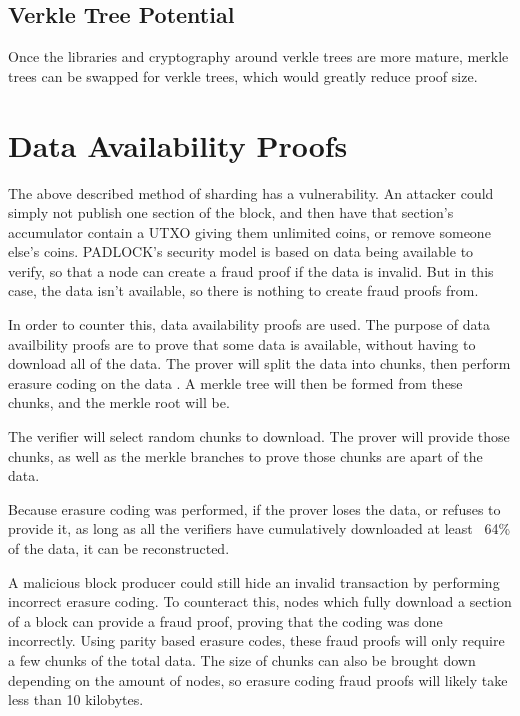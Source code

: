 \documentclass[12pt, letterpaper]{article}
\begin{document}

\subsection{Verkle Tree Potential}
Once the libraries and cryptography around verkle trees are more mature, merkle
trees can be swapped for verkle trees, which would greatly reduce proof size.

\section{Data Availability Proofs}
The above described method of sharding has a vulnerability. An attacker could
simply not publish one section of the block, and then have that section's
accumulator contain a UTXO giving them unlimited coins, or remove someone else's
coins. PADLOCK's security model is based on data being available to verify, so
that a node can create a fraud proof if the data is invalid. But in this case,
the data isn't available, so there is nothing to create fraud proofs from.

In order to counter this, data availability proofs are used. The purpose of data
availbility proofs are to prove that some data is available, without having to
download all of the data. The prover will split the data into chunks, then
perform erasure coding on the data . A merkle tree will then be formed from
these chunks, and the merkle root will be.

The verifier will select random chunks to download. The prover will provide
those chunks, as well as the merkle branches to prove those chunks are apart of
the data.

Because erasure coding was performed, if the prover loses the data, or refuses
to provide it, as long as all the verifiers have cumulatively downloaded at least ~64\% of the
data, it can be reconstructed.

A malicious block producer could still hide an invalid transaction by performing
incorrect erasure coding. To counteract this, nodes which fully download a
section of a block can provide a fraud proof, proving that the coding was done
incorrectly. Using parity based erasure codes, these fraud proofs will only
require a few chunks of the total data. The size of chunks can also be brought
down depending on the amount of nodes, so erasure coding fraud proofs will
likely take less than 10 kilobytes.
\end{document}
